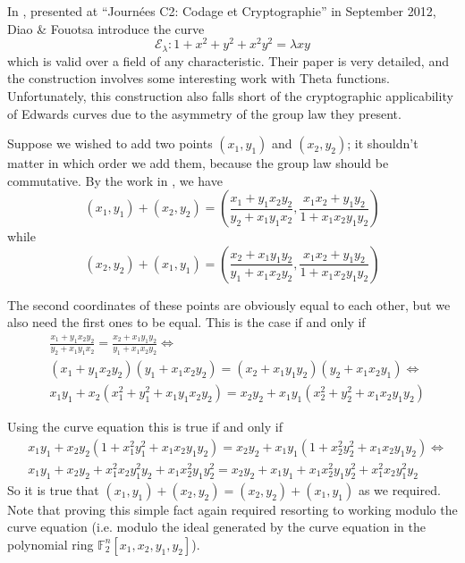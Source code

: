 In \cite{diao2012edwards}, presented at ``Journ\'ees C2: Codage et
    Cryptographie'' in September 2012, Diao \& Fouotsa introduce the curve
\[
\mathcal{E}_\lambda: 1 + x^2 + y^2 + x^2y^2 = \lambda xy
\]
    which is valid over a field of any characteristic.
Their paper is very detailed, and the construction involves some interesting
    work with Theta functions.
Unfortunately, this construction also falls short of the cryptographic
    applicability of Edwards curves due to the asymmetry of the group law they
    present.

Suppose we wished to add two points $(x_1, y_1)$ and $(x_2, y_2)$; it shouldn't
    matter in which order we add them, because the group law should be
    commutative.
By the work in \cite{diao2012edwards}, we have
\[
(x_1, y_1) + (x_2, y_2)
= \left(
\frac{x_1 + y_1x_2y_2}{y_2 + x_1y_1x_2},
\frac{x_1x_2 + y_1y_2}{1 + x_1x_2y_1y_2}
\right)
\]
    while
\[
(x_2, y_2) + (x_1, y_1)
= \left(
\frac{x_2 + x_1y_1y_2}{y_1 + x_1x_2y_2},
\frac{x_1x_2 + y_1y_2}{1 + x_1x_2y_1y_2}
\right)
\]

The second coordinates of these points are obviously equal to each other, but
    we also need the first ones to be equal.
This is the case if and only if
\begin{align*}
&\frac{x_1 + y_1x_2y_2}{y_2 + x_1y_1x_2}
    = \frac{x_2 + x_1y_1y_2}{y_1 + x_1x_2y_2} \iff\\
&(x_1 + y_1x_2y_2)(y_1 + x_1x_2y_2)
    = (x_2 + x_1y_1y_2)(y_2 + x_1x_2y_1) \iff\\
&x_1y_1 + x_2(x_1^2 + y_1^2 + x_1y_1x_2y_2)
    = x_2y_2 + x_1y_1(x_2^2 + y_2^2 + x_1x_2y_1y_2)
\end{align*}

Using the curve equation this is true if and only if
\begin{align*}
&x_1y_1 + x_2y_2(1 + x_1^2y_1^2 + x_1x_2y_1y_2)
    = x_2y_2 + x_1y_1(1 + x_2^2y_2^2 + x_1x_2y_1y_2) \iff\\
&x_1y_1 + x_2y_2 + x_1^2x_2y_1^2y_2 + x_1x_2^2y_1y_2^2
    = x_2y_2 + x_1y_1 + x_1x_2^2y_1y_2^2 + x_1^2x_2y_1^2y_2
\end{align*}
So it is true that $(x_1, y_1) + (x_2, y_2) = (x_2, y_2) + (x_1, y_1)$ as we
    required.
Note that proving this simple fact again required resorting to working modulo
    the curve equation (i.e. modulo the ideal generated by the curve equation
    in the polynomial ring $\mathbb{F}_2^n[x_1, x_2, y_1, y_2]$).


